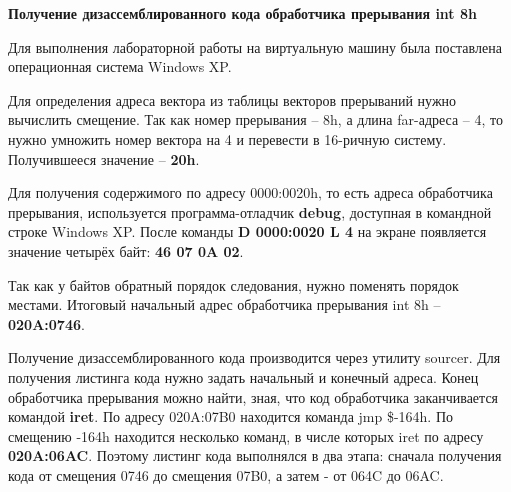\begin{center}
	{\bf\normalsize Получение дизассемблированного кода обработчика прерывания int 8h}
\end{center}

Для выполнения лабораторной работы на виртуальную машину была поставлена операционная система Windows XP.

Для определения адреса вектора из таблицы векторов прерываний нужно вычислить смещение.
Так как номер прерывания -- 8h, а длина far-адреса -- 4, то нужно умножить номер вектора на 4 и перевести в 16-ричную систему.
Получившееся значение -- \textbf{20h}.

Для получения содержимого по адресу 0000:0020h, то есть адреса обработчика прерывания, используется программа-отладчик 
\textbf{debug}, доступная в командной строке Windows XP. 
После команды \textbf{D 0000:0020 L 4} на экране появляется значение четырёх байт: \textbf{46 07 0A 02}. 

Так как у байтов обратный порядок следования, нужно поменять порядок местами. 
Итоговый начальный адрес обработчика прерывания int 8h -- \textbf{020A:0746}.

Получение дизассемблированного кода производится через утилиту sourcer. Для получения листинга кода нужно задать начальный и конечный адреса.
Конец обработчика прерывания можно найти, зная, что код обработчика заканчивается командой \textbf{iret}.
По адресу {020A:07B0} находится команда jmp \$-164h. По смещению -164h находится несколько команд, в числе которых iret по адресу \textbf{020A:06AC}.
Поэтому листинг кода выполнялся в два этапа: сначала получения кода от смещения 0746 до смещения 07B0, а затем - от 064C до 06AC. 
